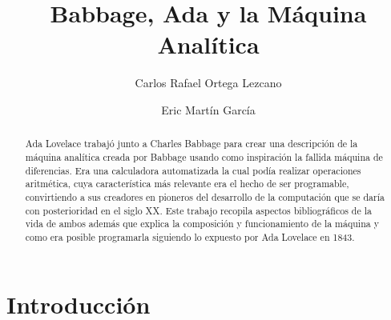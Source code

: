 \documentclass[runningheads,a4paper]{llncs}
\begin{document}
\mainmatter  %

\title{Babbage, Ada y la Máquina Analítica}


%
%
\author{Carlos Rafael Ortega Lezcano \and Eric Martín García}
%


%
%

\maketitle


\begin{abstract}
Ada Lovelace trabajó junto a Charles Babbage para crear una descripción de la máquina analítica creada por Babbage 
usando como inspiración la fallida máquina de diferencias. Era una calculadora automatizada la cual podía realizar
operaciones aritmética, cuya característica más relevante era el hecho de ser programable, convirtiendo a sus creadores
en pioneros del desarrollo de la computación que se daría con posterioridad en el siglo XX. Este trabajo recopila aspectos bibliográficos de la vida de ambos además que explica la composición y funcionamiento de la máquina y como era posible programarla siguiendo lo expuesto por Ada Lovelace en 1843.
\end{abstract}


\section{Introducción}
\end{document}

